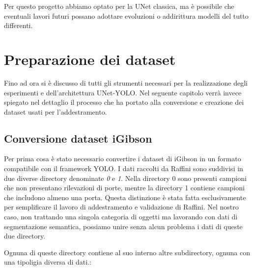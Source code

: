 \documentclass[12pt]{report}
\begin{document}
Per questo progetto abbiamo optato per la UNet classica, ma è possibile che eventuali lavori futuri possano adottare evoluzioni o addirittura modelli del tutto differenti.

\section{Preparazione dei dataset}
\label{sec:preparazione_dei_dataset}

Fino ad ora si è discusso di tutti gli strumenti necessari per la realizzazione degli esperimenti e dell'architettura UNet-YOLO. Nel seguente capitolo verrà invece spiegato nel dettaglio il processo che ha portato alla conversione e creazione dei dataset usati per l'addestramento.

\subsection{Conversione dataset iGibson}
\label{sec:conversione_dataset_igibson}

Per prima cosa è stato necessario convertire i dataset di iGibson in un formato compatibile con il framework YOLO. I dati raccolti da Raffini sono suddivisi in due diverse directory denominate \textit{0} e \textit{1}. Nella directory 0 sono presenti campioni che non presentano rilevazioni di porte, mentre la directory 1 contiene campioni che includono almeno una porta. Questa distinzione è stata fatta esclusivamente per semplificare il lavoro di addestramento e validazione di Raffini. Nel nostro caso, non trattando una singola categoria di oggetti ma lavorando con dati di segmentazione semantica, possiamo unire senza alcun problema i dati di queste due directory. 

Ognuna di queste directory contiene al suo interno altre subdirectory, ognuna con una tipoligia diversa di dati.:
\end{document}
